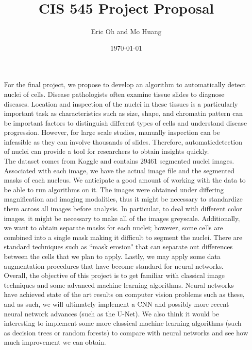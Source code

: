 \documentclass{article}
\title{CIS 545 Project Proposal}
\author{Eric Oh and Mo Huang}
\date{\today}
\begin{document}
\maketitle

For the final project, we propose to develop an algorithm to automatically detect nuclei of cells. Disease pathologists often examine tissue slides to diagnose diseases. Location and inspection of the nuclei in these tissues is a particularly important task as characteristics such as size, shape, and chromatin pattern can be important factors to distinguish different types of cells and understand disease progression. However, for large scale studies, manually inspection can be infeasible as they can involve thousands of slides. Therefore, automaticdetection of nuclei can provide a tool for researchers to obtain insights quickly. \\

The dataset comes from Kaggle and contains 29461 segmented nuclei images. Associated with each image, we have the actual image file and the segmented masks of each nucleus. We anticipate a good amount of working with the data to be able to run algorithms on it. The images were obtained under differing magnification and imaging modalities, thus it might be necessary to standardize them across all images before analysis. In particular, to deal with different color images, it might be necessary to make all of the images greyscale. Additionally, we want to obtain separate masks for each nuclei; however, some cells are combined into a single mask making it difficult to segment the nuclei. There are standard techniques such as ``mask erosion" that can separate out differences between the cells that we plan to apply. Lastly, we may apply some data augmentation procedures that have become standard for neural networks. \\

Overall, the objective of this project is to get familiar with classical image techniques and some advanced machine learning algorithms. Neural networks have achieved state of the art results on computer vision problems such as these, and as such, we will ultimately implement a CNN and possibly more recent neural network advances (such as the U-Net). We also think it would be interesting to implement some more classical machine learning algorithms (such as decision trees or random forests) to compare with neural networks and see how much improvement we can obtain. 
\end{document}
